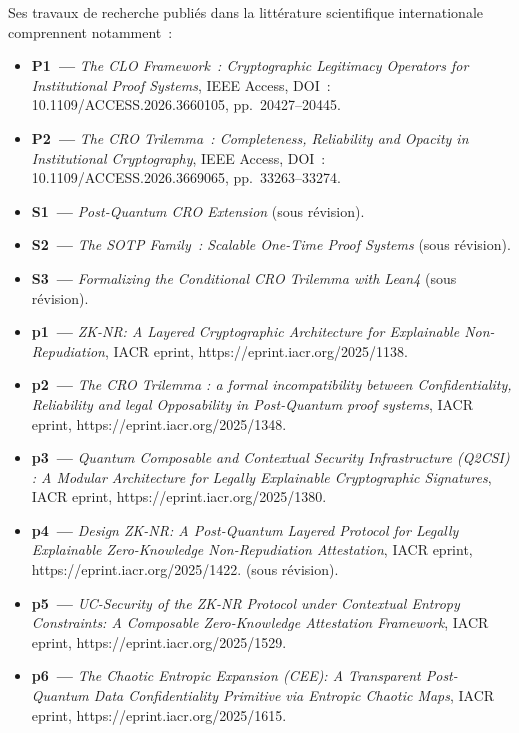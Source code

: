 Ses travaux de recherche publiés dans la littérature scientifique internationale
comprennent notamment~:
\begin{itemize}
  \item \textbf{P1~---} \textit{The CLO Framework~: Cryptographic Legitimacy Operators
        for Institutional Proof Systems}, IEEE Access, DOI~:
        10.1109/ACCESS.2026.3660105, pp.~20427--20445.
  \item \textbf{P2~---} \textit{The CRO Trilemma~: Completeness, Reliability and
        Opacity in Institutional Cryptography}, IEEE Access, DOI~:
        10.1109/ACCESS.2026.3669065, pp.~33263--33274.
  \item \textbf{S1~---} \textit{Post-Quantum CRO Extension} (sous révision).
  \item \textbf{S2~---} \textit{The SOTP Family~: Scalable One-Time Proof Systems}
        (sous révision).
  \item \textbf{S3~---} \textit{Formalizing the Conditional CRO Trilemma with Lean4}
        (sous révision).

  \item \textbf{p1~---} \textit{ZK-NR: A Layered Cryptographic Architecture for Explainable Non-Repudiation}, IACR eprint, https://eprint.iacr.org/2025/1138.
  \item \textbf{p2~---} \textit{The CRO Trilemma : a formal incompatibility between Confidentiality, Reliability and legal Opposability in Post-Quantum proof systems}, IACR eprint,
        https://eprint.iacr.org/2025/1348.
  \item \textbf{p3~---} \textit{Quantum Composable and Contextual Security Infrastructure (Q2CSI) : A Modular Architecture for Legally Explainable Cryptographic Signatures}, IACR eprint, https://eprint.iacr.org/2025/1380.
  \item \textbf{p4~---} \textit{Design ZK-NR: A Post-Quantum Layered Protocol for Legally Explainable Zero-Knowledge Non-Repudiation Attestation}, IACR eprint, https://eprint.iacr.org/2025/1422.
        (sous révision).
  \item \textbf{p5~---} \textit{UC-Security of the ZK-NR Protocol under Contextual Entropy Constraints: A Composable Zero-Knowledge Attestation Framework}, IACR eprint, https://eprint.iacr.org/2025/1529.

  \item \textbf{p6~---} \textit{The Chaotic Entropic Expansion (CEE): A Transparent Post-Quantum Data Confidentiality Primitive via Entropic Chaotic Maps}, IACR eprint, https://eprint.iacr.org/2025/1615.
   

\end{itemize}
